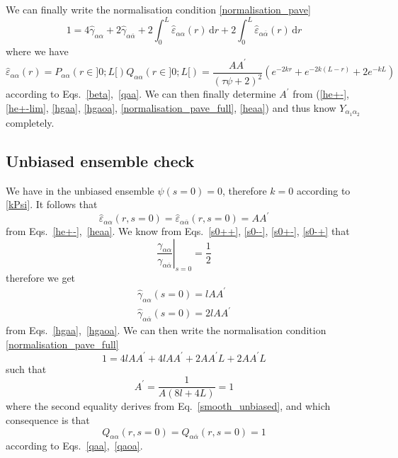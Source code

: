 \documentclass[pre,aps,superscriptaddress,nofootinbib]{revtex4}
\begin{document}
We can finally write the normalisation condition \eqref{normalisation_pave}
\begin{equation}
1 = 4 \hat{\gamma}_{\alpha\alpha} + 2 \hat{\gamma}_{\alpha\overline{\alpha}} + 2 \int_0^L \hat{\varepsilon}_{\alpha\alpha}(r) \, \mathrm{d}r + 2 \int_0^L \hat{\varepsilon}_{\alpha\overline{\alpha}}(r) \, \mathrm{d}r
\label{normalisation_pave_full}
\end{equation}
where we have
\begin{equation}
\hat{\varepsilon}_{\alpha\alpha}(r) = P_{\alpha\alpha}(r \in ]0; L[) Q_{\alpha\alpha}(r \in ]0; L[) = \frac{A A^{\prime}}{(\tau \psi + 2)^2} \left(e^{-2 k r} + e^{-2 k (L - r)} + 2 e^{-k L}\right)
\label{heaa}
\end{equation}
according to Eqs.~\ref{beta},~\ref{qaa}. We can then finally determine $A^{\prime}$ from (\ref{he+-}, \ref{he+-lim}, \ref{hgaa}, \ref{hgaoa}, \ref{normalisation_pave_full}, \ref{heaa}) and thus know $Y_{\alpha_1\alpha_2}$ completely.

\subsection{Unbiased ensemble check}

We have in the unbiased ensemble $\psi(s = 0) = 0$, therefore $k = 0$ according to \eqref{kPsi}. It follows that
\begin{equation}
\hat{\varepsilon}_{\alpha\alpha}(r, s=0) = \hat{\varepsilon}_{\alpha\overline{\alpha}}(r, s=0) = A A^{\prime}
\end{equation}
from Eqs.~\ref{he+-},~\ref{heaa}. We know from Eqs.~\ref{s0++}, \ref{s0--}, \ref{s0+-}, \ref{s0-+} that
\begin{equation}
\left. \frac{\gamma_{\alpha\alpha}}{\gamma_{\alpha\overline{\alpha}}} \right|_{s=0} = \frac{1}{2}
\end{equation}
therefore we get
\begin{eqnarray}
\hat{\gamma}_{\alpha\alpha}(s=0) = l A A^{\prime}\\
\hat{\gamma}_{\alpha\overline{\alpha}}(s=0) = 2 l A A^{\prime}
\end{eqnarray}
from Eqs.~\ref{hgaa},~\ref{hgaoa}. We can then write the normalisation condition \eqref{normalisation_pave_full}
\begin{equation}
1 = 4 l A A^{\prime} + 4 l A A^{\prime} + 2 A A^{\prime} L + 2 A A^{\prime} L
\end{equation}
such that
\begin{equation}
A^{\prime} = \frac{1}{A( 8 l + 4 L)} = 1
\end{equation}
where the second equality derives from Eq.~\ref{smooth_unbiased}, and which consequence is that
\begin{equation}
Q_{\alpha\alpha}(r, s=0) = Q_{\alpha\overline{\alpha}}(r, s=0) = 1
\end{equation}
according to Eqs.~\ref{qaa},~\ref{qaoa}.



{\renewcommand{\bibname}{References}}
\end{document}
